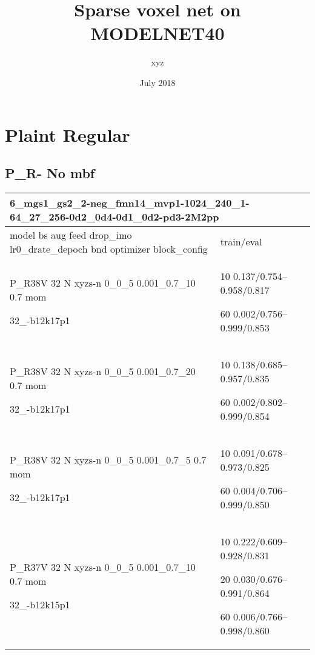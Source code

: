\documentclass[,table,dvipsnames]{article}
\title{Sparse voxel net on MODELNET40}
\author{xyz}
\date{July 2018}
\begin{document}
\noindent
\begin{titlepage}
	\maketitle
\end{titlepage}	

\tableofcontents{}

\section{Plaint Regular}
\subsection{P\_R- No mbf}
\noindent\begin{tabular}{|p{10cm}|p{5cm}| }	
	\hline
	\multicolumn{2}{|p{15cm}|}{ 6\_mgs1\_gs2\_2-neg\_fmn14\_mvp1-1024\_240\_1-64\_27\_256-0d2\_0d4-0d1\_0d2-pd3-2M2pp}\\
	\hline
	model bs aug feed drop\_imo lr0\_drate\_depoch bnd optimizer block\_config & train/eval \\
	
	\rowcolor{red!20}
	P\_R38V 32 N xyzs-n 0\_0\_5 0.001\_0.7\_10 0.7 mom \par 32\_-b12k17p1& 10 0.137/0.754--0.958/0.817\par 60 0.002/0.756--0.999/0.853\\
	
	\rowcolor{green!20}
	P\_R38V 32 N xyzs-n 0\_0\_5 0.001\_0.7\_20 0.7 mom \par 32\_-b12k17p1 &10 0.138/0.685--0.957/0.835\par 60 0.002/0.802--0.999/0.854\\
	
	\rowcolor{orange!20}
	P\_R38V 32 N xyzs-n 0\_0\_5 0.001\_0.7\_5 0.7 mom \par 32\_-b12k17p1& 10 0.091/0.678--0.973/0.825\par 60 0.004/0.706--0.999/0.850\\
	
	\rowcolor{blue!20}
	P\_R37V 32 N xyzs-n 0\_0\_5 0.001\_0.7\_10 0.7 mom \par 32\_-b12k15p1& 10 0.222/0.609--0.928/0.831\par 20 0.030/0.676--0.991/0.864\par 60 0.006/0.766--0.998/0.860\\
	
	\hline 
\end{tabular}
\end{document}
